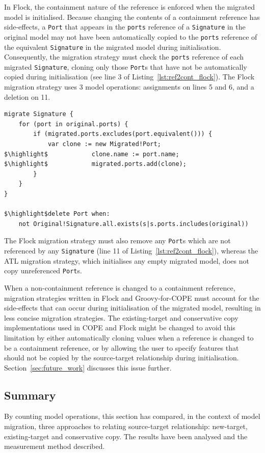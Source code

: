 In Flock, the containment nature of the reference is enforced when the migrated model is initialised. Because changing the contents of a containment reference has side-effects, a \texttt{Port} that appears in the \texttt{ports} reference of a \texttt{Signature} in the original model may not have been automatically copied to the \texttt{ports} reference of the equivalent \texttt{Signature} in the migrated model during initialisation. Consequently, the migration strategy must check the \texttt{ports} reference of each migrated \texttt{Signature}, cloning only those \texttt{Port}s that have not be automatically copied during initialisation (see line 3 of Listing~\ref{lst:ref2cont_flock}). The Flock migration strategy uses 3 model operations: assignments on lines 5 and 6, and a deletion on 11.

\begin{lstlisting}[float=tbp, caption=Migration for Change Reference to Containment in Flock, label=lst:ref2cont_flock, language=Flock, tabsize=2]
migrate Signature {
	for (port in original.ports) {
		if (migrated.ports.excludes(port.equivalent())) {
			var clone := new Migrated!Port;
$\highlight$			clone.name := port.name;
$\highlight$			migrated.ports.add(clone);
		}
	}
}

$\highlight$delete Port when:
	not Original!Signature.all.exists(s|s.ports.includes(original))
\end{lstlisting}

The Flock migration strategy must also remove any \texttt{Port}s which are not referenced by any \texttt{Signature} (line 11 of Listing~\ref{lst:ref2cont_flock}), whereas the ATL migration strategy, which initialises any empty migrated model, does not copy unreferenced \texttt{Port}s.

When a non-containment reference is changed to a containment reference, migration strategies written in Flock and Groovy-for-COPE must account for the side-effects that can occur during initialisation of the migrated model, resulting in less concise migration strategies. The existing-target and conservative copy implementations used in COPE and Flock might be changed to avoid this limitation by either automatically cloning values when a reference is changed to be a containment reference, or by allowing the user to specify features that should not be copied by the source-target relationship during initialisation. Section~\ref{sec:future_work} discusses this issue further. 

\subsection{Summary}
By counting model operations, this section has compared, in the context of model migration, three approaches to relating source-target relationship: new-target, existing-target and conservative copy. The results have been analysed and the measurement method described.

